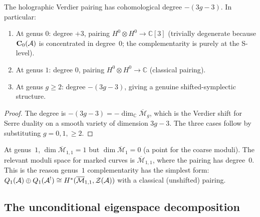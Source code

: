\begin{proposition}
\label{prop:thqg-III-degree-shift}
The holographic Verdier pairing has cohomological degree
$-(3g - 3)$. In particular:
\begin{enumerate}[label=\textup{(\alph*)}]
\item At genus $0$: degree $+3$, pairing
 $H^0 \otimes H^0 \to \mathbb{C}[3]$
 \textup{(}trivially degenerate because
 $\mathbf{C}_0(\mathcal{A})$ is concentrated in degree~$0$;
 the complementarity is purely at the S-level\textup{)}.
\item At genus $1$: degree $0$, pairing
 $H^0 \otimes H^0 \to \mathbb{C}$
 \textup{(}classical pairing\textup{)}.
\item At genus $g \ge 2$: degree $-(3g - 3)$,
 giving a genuine shifted-symplectic structure.
\end{enumerate}
\end{proposition}

\begin{proof}
The degree is $-(3g - 3) = -\dim_{\mathbb{C}}
\overline{\mathcal{M}}_g$, which is the Verdier shift for
Serre duality on a smooth variety of dimension $3g - 3$.
The three cases follow by substituting $g = 0, 1, \ge 2$.
\end{proof}

\begin{remark}
\label{rem:thqg-III-genus-1-special}
At genus~$1$, $\dim \overline{\mathcal{M}}_{1,1} = 1$
but $\dim \overline{\mathcal{M}}_1 = 0$ (a point for the
coarse moduli). The relevant moduli space for marked curves
is $\overline{\mathcal{M}}_{1,1}$, where the pairing has
degree~$0$. This is the reason genus~$1$ complementarity
has the simplest form:
$Q_1(\mathcal{A}) \oplus Q_1(\mathcal{A}^!) \cong H^*(\overline{\mathcal{M}}_{1,1},
\mathcal{Z}(\mathcal{A}))$ with a classical (unshifted) pairing.
\end{remark}

%
%

\subsection{The unconditional eigenspace decomposition}
\label{subsec:thqg-III-eigenspace-decomposition}


